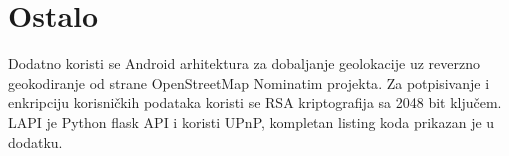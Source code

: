 %
%
\section{Ostalo}
Dodatno koristi se Android arhitektura za dobaljanje geolokacije\cite{geoa} uz reverzno geokodiranje od strane OpenStreetMap Nominatim projekta\cite{nominatim}. Za potpisivanje i enkripciju korisničkih podataka koristi se RSA\cite{rivest1978method} kriptografija sa 2048 bit ključem. LAPI je Python flask API i koristi UPnP, kompletan listing koda prikazan je u dodatku.